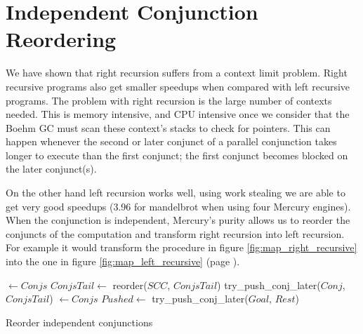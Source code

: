 
\section{Independent Conjunction Reordering}
\label{sec:rts_reorder}


We have shown that right recursion suffers from a context limit problem.
Right recursive programs also get smaller speedups when compared with left
recursive programs.
The problem with right recursion is the large number of contexts needed.
This is memory intensive, and CPU intensive once we consider that
the Boehm GC must scan these context's stacks to check for pointers.
This can happen whenever the second or later
conjunct of a parallel conjunction
takes longer to execute than the first conjunct;
the first conjunct becomes blocked on the later conjunct(s).

On the other hand left recursion works well,
using work stealing we are able to get very good speedups (3.96 for
mandelbrot when using four Mercury engines).
When the conjunction is independent,
Mercury's purity allows us to reorder the conjuncts of the computation and
transform right recursion into left recursion.
For example it would transform the procedure in figure
\ref{fig:map_right_recursive} into the one in figure
\ref{fig:map_left_recursive} (page \pageref{fig:map_right_recursive}).

\begin{algorithm}
\begin{algorithmic}[1]
        \State \Return \nil
    \Else
        \State {} $\gets Conjs$
        \State $ConjsTail \gets$ reorder($SCC$, $ConjsTail$)
            \State \Return {}
        \Else
            \State \Return try\_push\_conj\_later($Conj$, $ConjsTail$)
        \EndIf
    \EndIf
\EndProcedure
{}
        \State \Return {}
    \Else
        \State {} $\gets Conjs$
            \State $Pushed \gets$ try\_push\_conj\_later($Goal$, $Rest$)
            \State \Return {}
        \Else
            \State \Return {}
        \EndIf
    \EndIf
\EndProcedure
\end{algorithmic}
\caption{Reorder independent conjunctions}
\label{alg:reorder_conjunction}
\end{algorithm}

